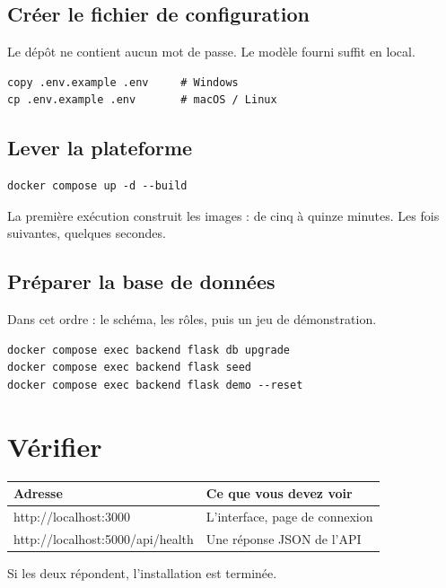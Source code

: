 \documentclass[11pt,a4paper]{article}
\begin{document}
\subsection*{Créer le fichier de configuration}
Le dépôt ne contient aucun mot de passe. Le modèle fourni suffit en local.
\begin{lstlisting}
copy .env.example .env     # Windows
cp .env.example .env       # macOS / Linux
\end{lstlisting}

\subsection*{Lever la plateforme}
\begin{lstlisting}
docker compose up -d --build
\end{lstlisting}
La première exécution construit les images : de cinq à quinze minutes. Les
fois suivantes, quelques secondes.

\subsection*{Préparer la base de données}
Dans cet ordre : le schéma, les rôles, puis un jeu de démonstration.
\begin{lstlisting}
docker compose exec backend flask db upgrade
docker compose exec backend flask seed
docker compose exec backend flask demo --reset
\end{lstlisting}

\section{Vérifier}

\begin{center}
\begin{tabular}{@{}>{\ttfamily}p{6.2cm}p{8.4cm}@{}}
\toprule
\textrm{\textbf{Adresse}} & \textbf{Ce que vous devez voir}\\
\midrule
http://localhost:3000 & L'interface, page de connexion\\
http://localhost:5000/api/health & Une réponse JSON de l'API\\
\bottomrule
\end{tabular}
\end{center}

\noindent Si les deux répondent, l'installation est terminée.

\end{document}
